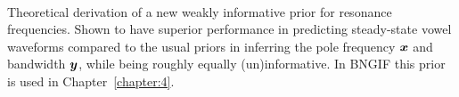 \begin{chapterappendices}{1}
\paragraph{\cite{VanSoom2021}}
Theoretical derivation of a new weakly informative prior for resonance frequencies.
Shown to have superior performance in predicting steady-state vowel waveforms compared to the usual priors in inferring the pole frequency ${\bm x}$ and bandwidth ${\bm y}$, while being roughly equally (un)informative.
In BNGIF this prior is used in Chapter~\ref{chapter:4}.

\end{chapterappendices}
